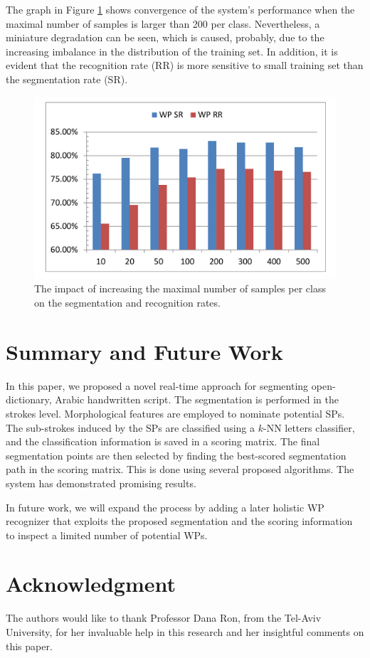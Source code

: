 \documentclass[10pt, conference, compsocconf]{IEEEtran}
\begin{document}
The graph in Figure \ref{fig:num_letter_impact} shows convergence of the system's performance when the maximal number of samples is larger than 200 per class. 
Nevertheless, a miniature degradation can be seen, which is caused, probably, due to the increasing imbalance in the distribution of the training set.
In addition, it is evident that the recognition rate (RR) is more sensitive to small training set than the segmentation rate (SR).

\begin{figure}
\centering
\includegraphics[width=1\columnwidth]{./figures/num_letter_impact}
\caption{The impact of increasing the maximal number of samples per class on the segmentation and recognition rates.}
\label{fig:num_letter_impact}
\end{figure}

\section{Summary and Future Work}
In this paper, we proposed a novel real-time approach for segmenting open-dictionary, Arabic handwritten script.
The segmentation is performed in the strokes level. 
Morphological features are employed to nominate potential SPs. 
The sub-strokes induced by the SPs are classified using a $k$-NN letters classifier, and the classification information is saved in a scoring matrix.
The final segmentation points are then selected by finding the best-scored segmentation path in the scoring matrix. 
This is done using several proposed algorithms. 
The system has demonstrated promising results.

In future work, we will expand the process by adding a later holistic WP recognizer that exploits the proposed segmentation and the scoring information to inspect a limited number of potential WPs.

\section*{Acknowledgment}
The authors would like to thank Professor Dana Ron, from the Tel-Aviv University, for her invaluable help in this research and her insightful comments on this paper. 



\end{document}
